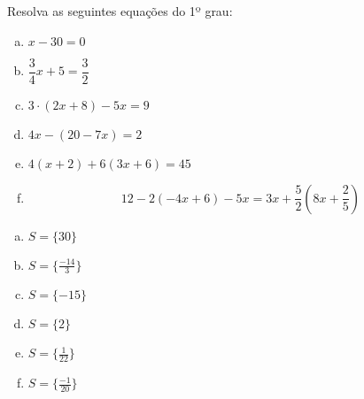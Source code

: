 \begin{exer}
Resolva as seguintes equações do 1º grau:

\begin{multicols}{2}
\begin{enumerate}[a)]
\item $x - 30=0$
\item $\dfrac{3}{4}x + 5= \dfrac{3}{2}$
\item $3 \cdot (2x + 8) - 5x= 9$
\item $4x - (20 - 7x)= 2$
\item $4(x+2) + 6(3x+6)= 45$
\item \[ 12 - 2(-4x + 6) - 5x= 3x + \dfrac{5}{2}\left(8x + \dfrac{2}{5} \right) \]
\end{enumerate}
\end{multicols}
\end{exer}

\begin{resp}
\begin{multicols}{3}
 \begin{enumerate}[a)]
\item $S= \{30 \}$
\item $S= \{ \frac{-14}{3} \}$
\item $S= \{ -15 \}$
\item $S= \{ 2 \}$
\item $S= \{ \frac{1}{22} \}$
\item $S= \{ \frac{-1}{20} \}$
\end{enumerate}
\end{multicols}
\end{resp}

